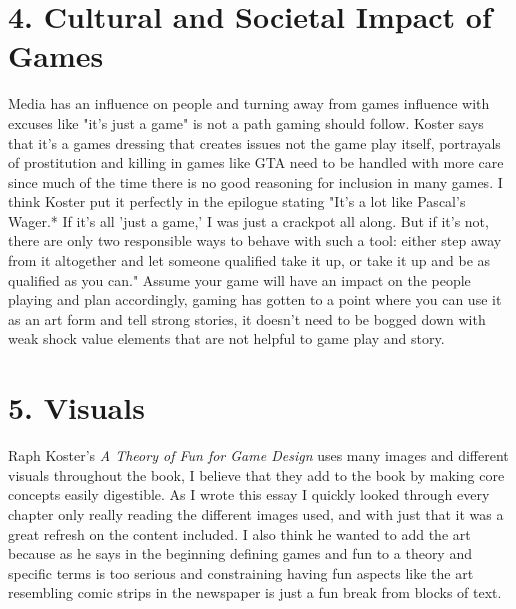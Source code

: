 \documentclass[12pt]{article}
\theoremstyle{definition}
\begin{document}
\section*{4. Cultural and Societal Impact of Games}
Media has an influence on people and turning away from games influence with excuses like "it's just a game" is not a path gaming should follow. Koster says that it's a games dressing that creates issues not the game play itself, portrayals of prostitution and killing in games like GTA need to be handled with more care since much of the time there is no good reasoning for inclusion in many games. I think Koster put it perfectly in the epilogue stating "It’s a lot like Pascal’s Wager.* If it’s all 'just a game,' I was just a crackpot all along. But if it’s not, there are only two responsible ways to behave with such a tool: either step away from it altogether and let someone qualified take it up, or take it up and be as qualified as you can." Assume your game will have an impact on the people playing and plan accordingly, gaming has gotten to a point where you can use it as an art form and tell strong stories, it doesn't need to be bogged down with weak shock value elements that are not helpful to game play and story.

\section*{5. Visuals}
Raph Koster’s \textit{A Theory of Fun for Game Design} uses many images and different visuals throughout the book, I believe that they add to the book by making core concepts easily digestible. As I wrote this essay I quickly looked through every chapter only really reading the different images used, and with just that it was a great refresh on the content included. I also think he wanted to add the art because as he says in the beginning defining games and fun to a theory and specific terms is too serious and constraining having fun aspects like the art resembling comic strips in the newspaper is just a fun break from blocks of text.
\end{document}
